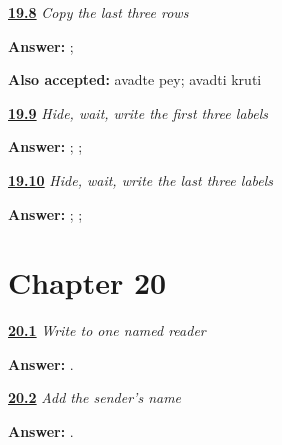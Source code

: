 \noindent\begin{minipage}[t]{\linewidth}
\raggedright
\hyperlink{review-MR-A1F02-last-three-copy-check}{\textbf{19.8}} \emph{Copy the last three rows}\par
\small \textbf{Answer:}  ;  \par
\footnotesize \textbf{Also accepted:} avadte pey; avadti kruti
\end{minipage}\par\medskip

\noindent\begin{minipage}[t]{\linewidth}
\raggedright
\hyperlink{review-MR-A1F03-first-three-delayed-check}{\textbf{19.9}} \emph{Hide, wait, write the first three labels}\par
\small \textbf{Answer:} ; ; \par
\end{minipage}\par\medskip

\noindent\begin{minipage}[t]{\linewidth}
\raggedright
\hyperlink{review-MR-A1F03-last-three-delayed-check}{\textbf{19.10}} \emph{Hide, wait, write the last three labels}\par
\small \textbf{Answer:}  ;  ;  \par
\end{minipage}\par\medskip

\section*{Chapter 20}

\noindent\begin{minipage}[t]{\linewidth}
\raggedright
\hyperlink{review-MR-A1M01-reader-greeting-check}{\textbf{20.1}} \emph{Write to one named reader}\par
\small \textbf{Answer:}  .\par
\end{minipage}\par\medskip

\noindent\begin{minipage}[t]{\linewidth}
\raggedright
\hyperlink{review-MR-A1M02-name-line-check}{\textbf{20.2}} \emph{Add the sender's name}\par
\small \textbf{Answer:}    .\par
\end{minipage}\par\medskip

